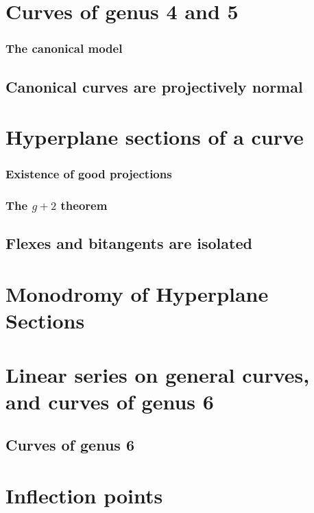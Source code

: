 \begin{theorem}
\chapter{Curves of genus 4 and 5}
\label{genus 4, 5 Chapter}
\subsection{The canonical model}\label{canonical genus 4}
\section{Canonical curves are projectively normal}\label{Noether theorem section} %

\chapter{Hyperplane sections of a curve}
\label{linear general position chapter}
\subsection{Existence of good projections}\label{projection section}\label{good projections}
\subsection{The $g+2$ theorem}\label{g+2 section}
\section{Flexes and bitangents are isolated}\label{isolated flexes and bitangents}

\chapter{Monodromy of Hyperplane Sections}
\label{uniform position}

\chapter{Linear series on general curves, and curves of genus 6}
\label{Brill-Noether}\label{BNChapter}
\section{Curves of genus 6}\label{genus 6 section}

\chapter{Inflection points}\label{inflections chapter}
\label{InflectionsChapter}

\end{theorem}
